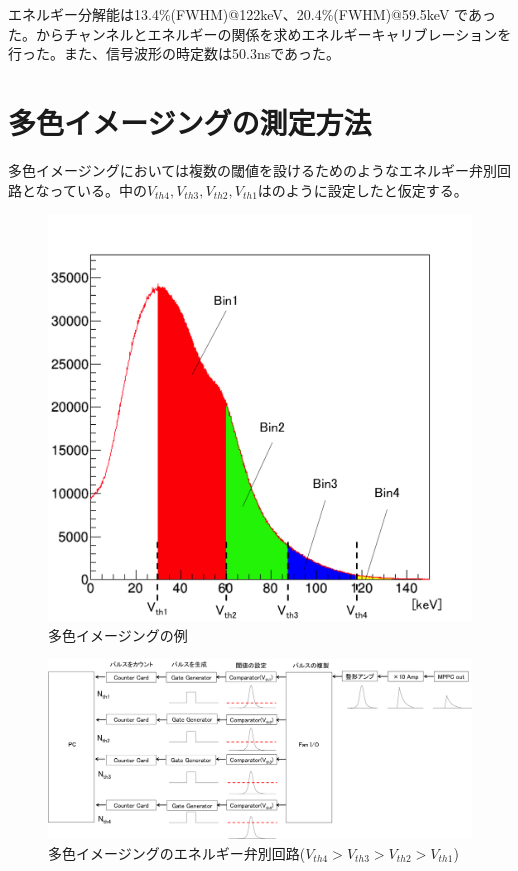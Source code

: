 エネルギー分解能は13.4\%(FWHM)@122keV、20.4\%(FWHM)@59.5keV であった。からチャンネルとエネルギーの関係を求めエネルギーキャリブレーションを行った。また、信号波形の時定数は50.3nsであった。


\section{多色イメージングの測定方法}

多色イメージングにおいては複数の閾値を設けるためのようなエネルギー弁別回路となっている。中の$V_{th4},V_{th3},V_{th2},V_{th1}$はのように設定したと仮定する。


\begin{figure}[H]
 \begin{center}
 \includegraphics[bb=0.000000 0.000000 563.473420 540.915284,width=0.7\hsize]{image2/chapter5/spectrum_multi.png} 
 \end{center}
 \caption{多色イメージングの例}
 \label{fig:spectrum_multi}
\end{figure}


\begin{figure}[H]
 \begin{center}
 \includegraphics[bb=0.000000 0.000000 1234.937912 525.556554,width=1\hsize]{image2/chapter5/read_circuit_pulse_multi.png} 
 \end{center}
 \caption{多色イメージングのエネルギー弁別回路($V_{th4}>V_{th3}>V_{th2}>V_{th1}$)}
 \label{fig:read_circuit_pulse_multi}
\end{figure}

